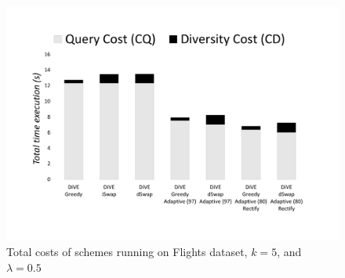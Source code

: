 \documentclass{article}
\begin{document}
\begin{figure}
	\begin{center}
			\vspace{-230pt}
		\includegraphics[width=6.5in]{figures/flight_costs_rectifying}
		\vspace{-40pt}
		\caption{Total costs of schemes running on Flights dataset, $k = 5$, and $\lambda = 0.5$ }
		\label{fig:flight_costs_all_rectifying}
		\vspace{-10pt}
	\end{center}
\end{figure}
\end{document}
